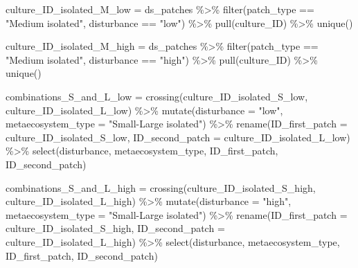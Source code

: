\documentclass[
]{article}
\newenvironment{Shaded}{\begin{snugshade}}{\end{snugshade}}
\newcommand{\AttributeTok}[1]{\textcolor[rgb]{0.77,0.63,0.00}{#1}}
\newcommand{\FunctionTok}[1]{\textcolor[rgb]{0.00,0.00,0.00}{#1}}
\newcommand{\NormalTok}[1]{#1}
\newcommand{\OtherTok}[1]{\textcolor[rgb]{0.56,0.35,0.01}{#1}}
\newcommand{\SpecialCharTok}[1]{\textcolor[rgb]{0.00,0.00,0.00}{#1}}
\newcommand{\StringTok}[1]{\textcolor[rgb]{0.31,0.60,0.02}{#1}}
\begin{document}
\begin{Shaded}
\begin{Highlighting}[]
\NormalTok{culture\_ID\_isolated\_M\_low }\OtherTok{=}\NormalTok{ ds\_patches }\SpecialCharTok{\%\textgreater{}\%}
  \FunctionTok{filter}\NormalTok{(patch\_type }\SpecialCharTok{==} \StringTok{"Medium isolated"}\NormalTok{,}
\NormalTok{         disturbance }\SpecialCharTok{==} \StringTok{"low"}\NormalTok{) }\SpecialCharTok{\%\textgreater{}\%}
  \FunctionTok{pull}\NormalTok{(culture\_ID) }\SpecialCharTok{\%\textgreater{}\%}
  \FunctionTok{unique}\NormalTok{()}

\NormalTok{culture\_ID\_isolated\_M\_high }\OtherTok{=}\NormalTok{ ds\_patches }\SpecialCharTok{\%\textgreater{}\%}
  \FunctionTok{filter}\NormalTok{(patch\_type }\SpecialCharTok{==} \StringTok{"Medium isolated"}\NormalTok{,}
\NormalTok{         disturbance }\SpecialCharTok{==} \StringTok{"high"}\NormalTok{) }\SpecialCharTok{\%\textgreater{}\%}
  \FunctionTok{pull}\NormalTok{(culture\_ID) }\SpecialCharTok{\%\textgreater{}\%}
  \FunctionTok{unique}\NormalTok{()}

\NormalTok{combinations\_S\_and\_L\_low }\OtherTok{=} \FunctionTok{crossing}\NormalTok{(culture\_ID\_isolated\_S\_low,}
\NormalTok{                                    culture\_ID\_isolated\_L\_low) }\SpecialCharTok{\%\textgreater{}\%}
                            \FunctionTok{mutate}\NormalTok{(}\AttributeTok{disturbance =} \StringTok{"low"}\NormalTok{,}
                                   \AttributeTok{metaecosystem\_type =} \StringTok{"Small{-}Large isolated"}\NormalTok{) }\SpecialCharTok{\%\textgreater{}\%}
                            \FunctionTok{rename}\NormalTok{(}\AttributeTok{ID\_first\_patch =}\NormalTok{ culture\_ID\_isolated\_S\_low,}
                                   \AttributeTok{ID\_second\_patch =}\NormalTok{ culture\_ID\_isolated\_L\_low) }\SpecialCharTok{\%\textgreater{}\%}
                            \FunctionTok{select}\NormalTok{(disturbance,}
\NormalTok{                                   metaecosystem\_type,}
\NormalTok{                                   ID\_first\_patch,}
\NormalTok{                                   ID\_second\_patch)}

\NormalTok{combinations\_S\_and\_L\_high }\OtherTok{=} \FunctionTok{crossing}\NormalTok{(culture\_ID\_isolated\_S\_high,}
\NormalTok{                                    culture\_ID\_isolated\_L\_high) }\SpecialCharTok{\%\textgreater{}\%}
                            \FunctionTok{mutate}\NormalTok{(}\AttributeTok{disturbance =} \StringTok{"high"}\NormalTok{,}
                                   \AttributeTok{metaecosystem\_type =} \StringTok{"Small{-}Large isolated"}\NormalTok{) }\SpecialCharTok{\%\textgreater{}\%}
                            \FunctionTok{rename}\NormalTok{(}\AttributeTok{ID\_first\_patch =}\NormalTok{ culture\_ID\_isolated\_S\_high,}
                                   \AttributeTok{ID\_second\_patch =}\NormalTok{ culture\_ID\_isolated\_L\_high) }\SpecialCharTok{\%\textgreater{}\%}
                            \FunctionTok{select}\NormalTok{(disturbance,}
\NormalTok{                                   metaecosystem\_type,}
\NormalTok{                                   ID\_first\_patch,}
\NormalTok{                                   ID\_second\_patch)}


\end{Highlighting}
\end{Shaded}
\end{document}
